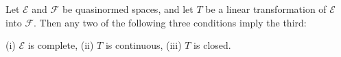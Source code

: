 Let $\mathcal{E}$ and $\mathcal{F}$ be quasinormed spaces, and let $T$ be a linear transformation of $\mathcal{E}$ into $\mathcal{F}$. Then any two of the following three conditions imply the third:

(i) $\mathcal{E}$ is complete,
(ii) $T$ is continuous,
(iii) $T$ is closed.
